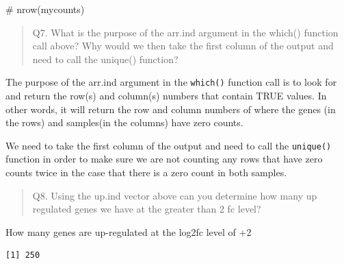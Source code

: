 \documentclass[
  letterpaper,
  DIV=11,
  numbers=noendperiod]{scrartcl}
\newenvironment{Shaded}{\begin{snugshade}}{\end{snugshade}}
\newcommand{\CommentTok}[1]{\textcolor[rgb]{0.37,0.37,0.37}{#1}}
\newcommand{\DecValTok}[1]{\textcolor[rgb]{0.68,0.00,0.00}{#1}}
\newcommand{\FunctionTok}[1]{\textcolor[rgb]{0.28,0.35,0.67}{#1}}
\newcommand{\NormalTok}[1]{\textcolor[rgb]{0.00,0.23,0.31}{#1}}
\newcommand{\SpecialCharTok}[1]{\textcolor[rgb]{0.37,0.37,0.37}{#1}}
\begin{document}
\begin{Shaded}
\begin{Highlighting}[]
\CommentTok{\# nrow(mycounts)}
\end{Highlighting}
\end{Shaded}

\begin{quote}
Q7. What is the purpose of the arr.ind argument in the which() function
call above? Why would we then take the first column of the output and
need to call the unique() function?
\end{quote}

The purpose of the arr.ind argument in the \texttt{which()} function
call is to look for and return the row(s) and column(s) numbers that
contain TRUE values. In other words, it will return the row and column
numbers of where the genes (in the rows) and samples(in the columns)
have zero counts.

We need to take the first column of the output and need to call the
\texttt{unique()} function in order to make sure we are not counting any
rows that have zero counts twice in the case that there is a zero count
in both samples.

\begin{quote}
Q8. Using the up.ind vector above can you determine how many up
regulated genes we have at the greater than 2 fc level?
\end{quote}

\begin{Shaded}
\end{Shaded}

How many genes are up-regulated at the log2fc level of +2

\begin{Shaded}
\end{Shaded}

\begin{verbatim}
[1] 250
\end{verbatim}

\begin{Shaded}
\end{Shaded}
\end{document}

